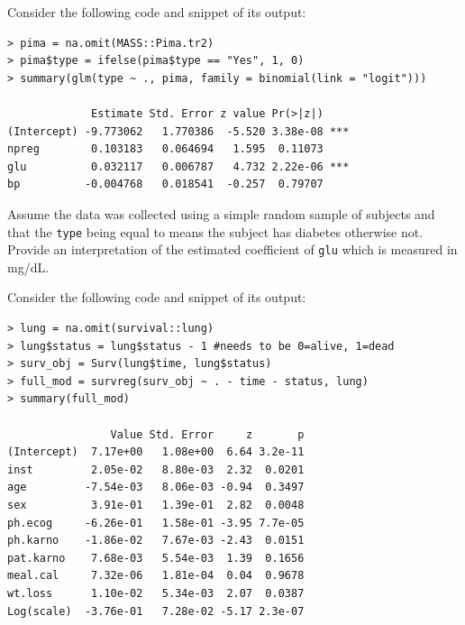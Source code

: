 \documentclass[12pt]{article}
\begin{document}
\begin{enumerate}[(a)]

 Consider the following code and snippet of its output:

\begin{Verbatim}[frame=single]
> pima = na.omit(MASS::Pima.tr2)
> pima$type = ifelse(pima$type == "Yes", 1, 0)
> summary(glm(type ~ ., pima, family = binomial(link = "logit")))

             Estimate Std. Error z value Pr(>|z|)    
(Intercept) -9.773062   1.770386  -5.520 3.38e-08 ***
npreg        0.103183   0.064694   1.595  0.11073    
glu          0.032117   0.006787   4.732 2.22e-06 ***
bp          -0.004768   0.018541  -0.257  0.79707    
\end{Verbatim}

Assume the data was collected using a simple random sample of subjects and that the \texttt{type} being equal to  means the subject has diabetes otherwise not. Provide an interpretation of the estimated coefficient of \texttt{glu} which is measured in mg/dL.

\iftoggle{solutions}{\inred{
When comparing two subjects (A) and (B) which are sampled in the same fashion as the other subjects in this dataset where (A) has a \texttt{glu} measurement 1mg/dL larger than (B)'s \texttt{glu} measurement but share the same other observed measurements otherwise, then (A) is predicted to have an estimated log odds probability of diabetes 0.032 $\pm$ 0.007 higher than (B)'s log odds probability of diabetes assuming the log odds probability of diabetes is linear in the measurements considered herein.
}}{~\spc{3}}
\pagebreak

 Consider the following code and snippet of its output:

\begin{Verbatim}[frame=single]
> lung = na.omit(survival::lung)
> lung$status = lung$status - 1 #needs to be 0=alive, 1=dead
> surv_obj = Surv(lung$time, lung$status)
> full_mod = survreg(surv_obj ~ . - time - status, lung)
> summary(full_mod)

                Value Std. Error     z       p
(Intercept)  7.17e+00   1.08e+00  6.64 3.2e-11
inst         2.05e-02   8.80e-03  2.32  0.0201
age         -7.54e-03   8.06e-03 -0.94  0.3497
sex          3.91e-01   1.39e-01  2.82  0.0048
ph.ecog     -6.26e-01   1.58e-01 -3.95 7.7e-05
ph.karno    -1.86e-02   7.67e-03 -2.43  0.0151
pat.karno    7.68e-03   5.54e-03  1.39  0.1656
meal.cal     7.32e-06   1.81e-04  0.04  0.9678
wt.loss      1.10e-02   5.34e-03  2.07  0.0387
Log(scale)  -3.76e-01   7.28e-02 -5.17 2.3e-07


\end{Verbatim}
\end{enumerate}
\end{document}
